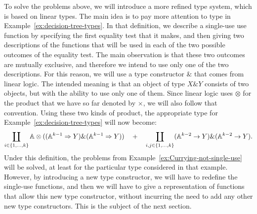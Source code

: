 To solve the problems above, we will introduce a more refined type system, which is based on linear types.  The main idea is to pay more attention to type  in Example~\ref{ex:decision-tree-types}. In that definition, we describe a single-use use function by specifying the first equality test that it makes, and then giving two descriptions of the functions that will be used in each of the two possible outcomes of the equality test. The main observation is that these two outcomes are mutually exclusive, and therefore we intend to use only one of the two descriptions. For this reason, we will use a  type constructor $\&$ that comes from linear logic. The intended meaning is  that an object of type $X \& Y$ consists of two objects, but with the ability to use only one of them. Since linear logic uses $\otimes$  for the  product that we have so far denoted by $\times$, we will also follow that convention. Using these two kinds of product, the appropriate type for Example~\ref{ex:decision-tree-types} will now become: 
\begin{align*}
\coprod_{i \in \{1,\ldots,k\}} 
        \mathbb A \otimes ((\mathbb A^{k-1} \Rightarrow Y) \& (\mathbb A^{k-1} \Rightarrow Y))
          \quad + \quad 
    \coprod_{i, j \in \{1,\ldots,k\}} (\mathbb A^{k-2} \to Y) \& (\mathbb A^{k-2} \to Y).
    \end{align*}
Under this definition, the problems from Example~\ref{ex:Currying-not-single-use} will be solved, at least for the particular type considered in that example. However, by introducing a new type constructor, we will have to redefine the single-use functions, and then we will have to give a representation of functions that allow this new type constructor, without incurring the need to add any other new type constructors. This is the subject of the next section.

